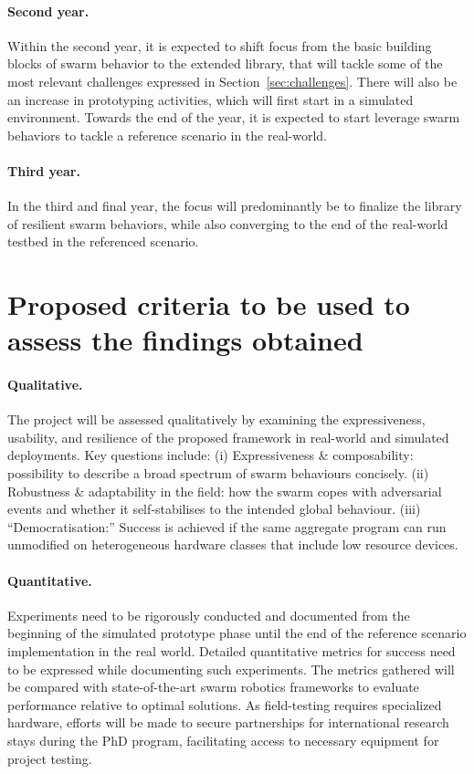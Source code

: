 \documentclass[12pt]{article}
\begin{document}
\paragraph{Second year.} Within the second year, it is expected to shift focus from the basic building blocks of swarm behavior to the extended library, that will tackle some of the most relevant challenges expressed in Section~\ref{sec:challenges}.
There will also be an increase in prototyping activities, which will first start in a simulated environment.
Towards the end of the year, it is expected to start leverage swarm behaviors to tackle a reference scenario in the real-world.

\paragraph{Third year.} In the third and final year, the focus will predominantly be to finalize the library of resilient swarm behaviors, while also converging to the end of the real-world testbed in the referenced scenario.

\section{Proposed criteria to be used to assess the findings obtained}

\paragraph{Qualitative.}
The project will be assessed qualitatively by examining the expressiveness, usability, and resilience of the proposed framework in real-world and simulated deployments.  
Key questions include:  
(i) Expressiveness \& composability: possibility to describe a broad spectrum of swarm behaviours concisely. 
(ii) Robustness \& adaptability in the field: how the swarm copes with adversarial events and whether it self‑stabilises to the intended global behaviour.  
(iii) “Democratisation:” Success is achieved if the same aggregate program can run unmodified on heterogeneous hardware classes that include low resource devices.


\paragraph{Quantitative.}
Experiments need to be rigorously conducted and documented from the beginning of the simulated prototype phase until the end of the reference scenario implementation in the real world.
Detailed quantitative metrics for success need to be expressed while documenting such experiments. 
The metrics gathered will be compared with state-of-the-art swarm robotics frameworks to evaluate performance relative to optimal solutions.
As field-testing requires specialized hardware, efforts will be made to secure partnerships for international research stays during the PhD program, facilitating access to necessary equipment for project testing.
\end{document}
